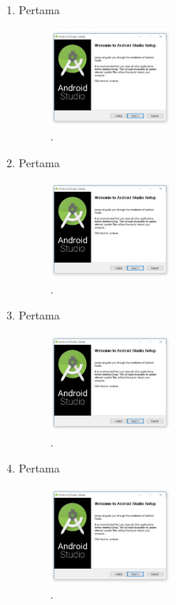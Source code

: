 \begin{enumerate}
	\item Pertama
	\begin{figure}[H]
		\includegraphics[width=4cm]{figures/installas/1.jpg}
		\centering
		\caption{.}
	\end{figure}
	
	\item Pertama
	\begin{figure}[H]
		\includegraphics[width=4cm]{figures/installas/1.jpg}
		\centering
		\caption{.}
	\end{figure}
	
	\item Pertama
	\begin{figure}[H]
		\includegraphics[width=4cm]{figures/installas/1.jpg}
		\centering
		\caption{.}
	\end{figure}
	
	\item Pertama
	\begin{figure}[H]
		\includegraphics[width=4cm]{figures/installas/1.jpg}
		\centering
		\caption{.}
	\end{figure}
	
\end{enumerate}